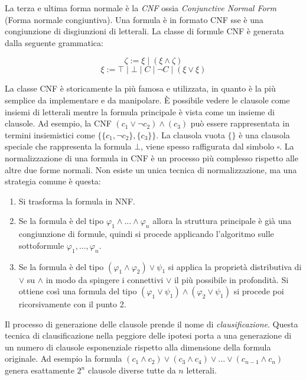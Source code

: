 \documentclass[./main.tex]{subfiles}
\begin{document}
La terza e ultima forma normale è la \textit{CNF} ossia \textit{Conjunctive Normal Form} (Forma normale congiuntiva). Una formula è in formato CNF
sse è una congiunzione di disgiunzioni di letterali. La classe di formule CNF è generata dalla seguente grammatica:


$$ \zeta := \xi \mid (\xi \land \zeta) $$
$$ \xi := \top \mid \bot \mid C \mid \lnot C \mid (\xi \lor \xi ) $$

La classe CNF è storicamente la più famosa e utilizzata, in quanto è la più semplice da implementare e da manipolare. È possibile vedere le clausole
come insiemi di letterali mentre la formula principale è vista come un insieme di clausole. Ad esempio, la CNF $(c_1 \lor \lnot c_2) \land (c_3)$ può essere rappresentata
in termini insiemistici come $\{\{c_1, \lnot c_2\}, \{c_3\}\}$. 
La clausola vuota $\{\}$ è una clausola speciale che rappresenta la formula $\bot$, viene spesso raffigurata dal simbolo $\square$.
La normalizzazione di una formula in CNF è un processo più complesso rispetto alle altre due forme normali. Non esiste un unica tecnica di normalizzazione, ma
una strategia comune è questa:
\begin{enumerate}
  \item Si trasforma la formula in NNF.
  \item Se la formula è del tipo $\varphi_1 \land ... \land \varphi_n$ allora la struttura principale è già una congiunzione di formule,
   quindi si procede applicando l'algoritmo sulle sottoformule $\varphi_1, ..., \varphi_n$.
  \item Se la formula è del tipo $(\varphi_1 \land \varphi_2) \lor \psi_1$ si applica la proprietà distributiva di $\lor$ su $\land$ in 
  modo da spingere i connettivi $\lor$ il più possibile in profondità. Si ottiene così una formula del tipo
  $(\varphi_1 \lor \psi_1) \land (\varphi_2 \lor \psi_1)$ si procede poi ricorsivamente con il punto 2.
\end{enumerate}

Il processo di generazione delle clausole prende il nome di \textit{clausificazione}.
Questa tecnica di clausificazione nella peggiore delle ipotesi porta a una generazione di un numero di clausole esponenziale 
rispetto alla dimensione della formula originale. Ad esempio la formula $(c_1 \land c_2) \lor (c_3 \land c_4) \lor ... \lor (c_{n-1} \land c_{n})$ 
genera esattamente $2^{n}$ clausole diverse tutte da $n$ letterali.


\end{document}
